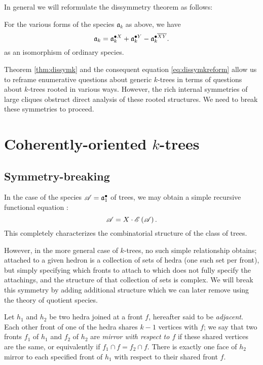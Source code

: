 \documentclass[sectionflow,singlespace,twoside,boldmathhdr,draft]{brandiss} %
\numberwithin{section}{chapter}
\numberwithin{figure}{chapter}
\begin{document}
In general we will reformulate the dissymmetry theorem as follows:
\begin{corollary}
  \label{cor:dissymkreform}
  For the various forms of the species $\mathfrak{a}_{k}$ as above, we have
  \begin{equation}
    \label{eq:dissymkreform}
    \mathfrak{a}_{k} = \pointed[X]{\mathfrak{a}}_{k} + \pointed[Y]{\mathfrak{a}}_{k} - \pointed[\overline{XY}]{\mathfrak{a}}_{k}.
  \end{equation}
  as an isomorphism of ordinary species.
\end{corollary}

Theorem \ref{thm:dissymk} and the consequent equation \eqref{eq:dissymkreform} allow us to reframe enumerative questions about generic $k$-trees in terms of questions about $k$-trees rooted in various ways.
However, the rich internal symmetries of large cliques obstruct direct analysis of these rooted structures.
We need to break these symmetries to proceed.

\section{Coherently-oriented $k$-trees}
\subsection{Symmetry-breaking}\label{ss:symbreak}
In the case of the species $\mathscr{A} =  {\mathfrak{a}}^{\bullet } _{1}$ of trees, we may obtain a simple recursive functional equation \cite[\S 1, eq.~(9)]{bll:species}:
\begin{equation}
  \label{eq:rtrees}
  \specname{A} = X \cdot \specname{E} \pbrac{\specname{A}}.
\end{equation}
This completely characterizes the combinatorial structure of the class of trees.

However, in the more general case of $k$-trees, no such simple relationship obtains; attached to a given hedron is a collection of sets of hedra (one such set per front), but simply specifying which fronts to attach to which does not fully specify the attachings, and the structure of that collection of sets is complex.
We will break this symmetry by adding additional structure which we can later remove using the theory of quotient species.

\begin{definition}
  \label{def:mirrorfronts}
  Let $h_{1}$ and $h_{2}$ be two hedra joined at a front $f$, hereafter said to be \emph{adjacent}.
  Each other front of one of the hedra shares $k-1$ vertices with $f$; we say that two fronts $f_{1}$ of $h_{1}$ and $f_{2}$ of $h_{2}$ are \emph{mirror with respect to $f$} if these shared vertices are the same, or equivalently if $f_{1} \cap f = f_{2} \cap f$.
  There is exactly one face of $h_{2}$ mirror to each specified front of $h_{1}$ with respect to their shared front $f$.
\end{definition}
\end{document}

